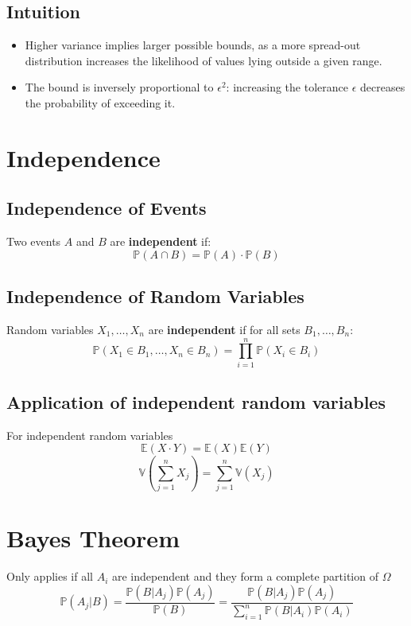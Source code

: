 \documentclass{article}
\begin{document}
\subsection{Intuition}

\begin{itemize}
    \item Higher variance implies larger possible bounds, as a more spread-out distribution increases the likelihood of values lying outside a given range.
    \item The bound is inversely proportional to $\epsilon^2$: increasing the tolerance $\epsilon$ decreases the probability of exceeding it.
\end{itemize}

\section{Independence}

\subsection{Independence of Events}

Two events $A$ and $B$ are \textbf{independent} if:
\[
    \mathbb{P}(A \cap B) = \mathbb{P}(A) \cdot \mathbb{P}(B)
\]

\subsection{Independence of Random Variables}

Random variables $X_1, \ldots, X_n$ are \textbf{independent} if for all sets $B_1, \ldots, B_n$:
\[
    \mathbb{P}(X_1 \in B_1, \ldots, X_n \in B_n) = \prod_{i=1}^n \mathbb{P}(X_i \in B_i)
\]
\subsection{Application of independent random variables}
For independent random variables
\[\mathbb{E}(X\cdot Y) = \mathbb{E}(X)\mathbb{E}(Y)\]
\[\mathbb{V}(\sum_{j=1}^nX_j) = \sum_{j=1}^n\mathbb{V}(X_j)\]

\section{Bayes Theorem}
Only applies if all $A_i$ are independent and they form a complete partition of $\Omega$
\[\mathbb{P}(A_j | B) = \frac{\mathbb{P}(B|A_j)\mathbb{P}(A_j)}{\mathbb{P}(B)} = \frac{\mathbb{P}(B|A_j)\mathbb{P}(A_j)}{\sum_{i=1}^{n} \mathbb{P}(B|A_i) \mathbb{P}(A_i)}\]
\end{document}
